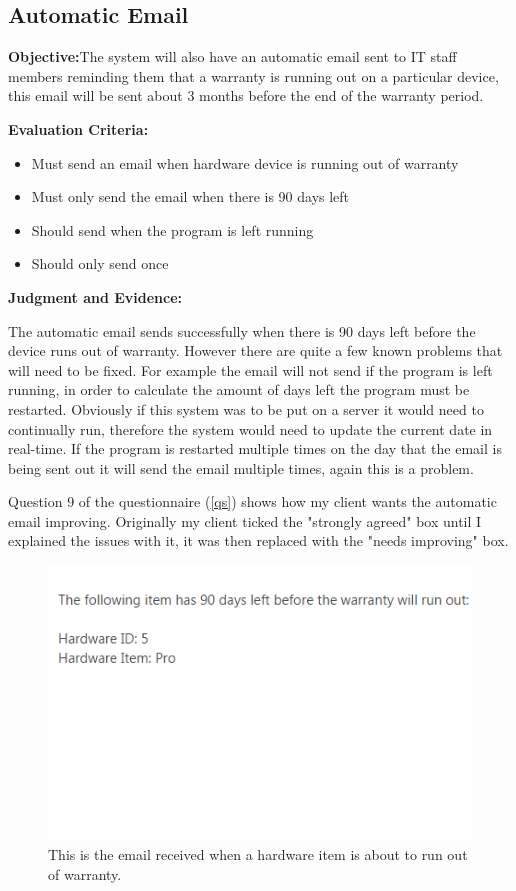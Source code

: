 \subsection{Automatic Email}

\textbf{Objective:}The system will also have an automatic email sent to IT staff members reminding them that a warranty is running out on a particular device, this email will be sent about 3 months before the end of the warranty period.

\textbf{Evaluation Criteria:}
\begin{itemize}
\item{Must send an email when hardware device is running out of warranty}
\item{Must only send the email when there is 90 days left}
\item{Should send when the program is left running}
\item{Should only send once}
\end{itemize}

\textbf{Judgment and Evidence:}

The automatic email sends successfully when there is 90 days left before the device runs out of warranty. However there are quite a few known problems that will need to be fixed. For example the email will not send if the program is left running, in order to calculate the amount of days left the program must be restarted. Obviously if this system was to be put on a server it would need to continually run, therefore the system would need to update the current date in real-time. If the program is restarted multiple times on the day that the email is being sent out it will send the email multiple times, again this is a problem.

Question 9 of the questionnaire (\ref{qs}) shows how my client wants the automatic email improving. Originally my client ticked the "strongly agreed" box until I explained the issues with it, it was then replaced with the "needs improving" box.

\begin{figure}[H]
    \includegraphics[width=\textwidth]{./Testing/Images/EmailExpiredHardware.png}
    \caption{This is the email received when a hardware item is about to run out of warranty.} 
\end{figure}

